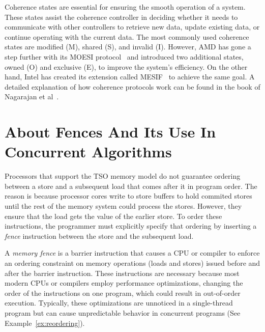 Coherence states are essential for ensuring the smooth operation of a system. These states assist the coherence controller in deciding whether it needs to communicate with other controllers to retrieve new data, update existing data, or continue operating with the current data. The most commonly used coherence states are modified (M), shared (S), and invalid (I). However, AMD has gone a step further with its MOESI protocol~\cite{devices_amd64} and introduced two additional states, owned (O) and exclusive (E), to improve the system's efficiency. On the other hand, Intel has created its extension called MESIF~\cite{guideintel} to achieve the same goal. A detailed explanation of how coherence protocols work can be found in the book of Nagarajan et al~\cite{DBLP_series_synthesis_2020Nagarajan}.

\section{About Fences And Its Use In Concurrent Algorithms}

Processors that support the TSO memory model do not guarantee ordering between a store and a subsequent load that comes after it in program order. The reason is because processor cores write to store buffers to hold commited stores until the rest of the memory system could process the stores. However, they ensure that the load gets the value of the earlier store. To order these instructions, the programmer must explicitly specify that ordering by inserting a \emph{fence} instruction between the store and the subsequent load.


A \emph{memory fence} is a barrier instruction that causes a CPU or compiler to enforce an ordering constraint on memory operations (loads and stores) issued before and after the barrier instruction. These instructions are necessary because most modern CPUs or compilers employ performance optimizations, changing the order of the instructions on one program, which could result in out-of-order execution. Typically, these optimizations are unnoticed in a single-thread program but can cause unpredictable behavior in concurrent programs (See Example~\ref{ex:reordering}).

